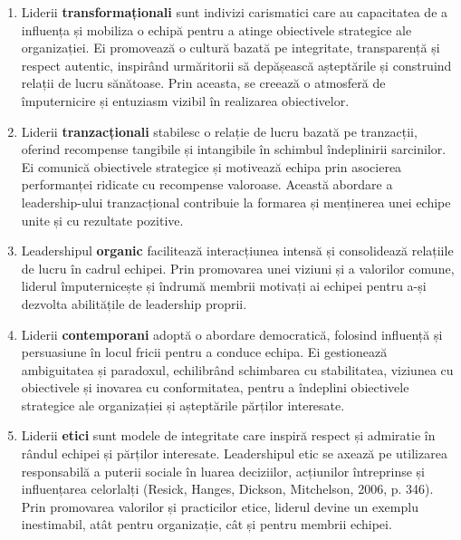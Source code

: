 \documentclass[a4paper, 12pt]{article}
\begin{document}
	\begin{enumerate}[(1)]

		\item Liderii \textbf {transformaționali}  sunt indivizi carismatici care au capacitatea de a influența și mobiliza o echipă pentru a atinge obiectivele strategice ale organizației. Ei promovează o cultură bazată pe integritate, transparență și respect autentic, inspirând urmăritorii să depășească așteptările și construind relații de lucru sănătoase. Prin aceasta, se creează o atmosferă de împuternicire și entuziasm vizibil în realizarea obiectivelor.

		\item Liderii \textbf {tranzacționali} stabilesc o relație de lucru bazată pe tranzacții, oferind recompense tangibile și intangibile în schimbul îndeplinirii sarcinilor. Ei comunică obiectivele strategice și motivează echipa prin asocierea performanței ridicate cu recompense valoroase. Această abordare a leadership-ului tranzacțional contribuie la formarea și menținerea unei echipe unite și cu rezultate pozitive.

		\item Leadershipul \textbf {organic} facilitează interacțiunea intensă și consolidează relațiile de lucru în cadrul echipei. Prin promovarea unei viziuni și a valorilor comune, liderul împuternicește și îndrumă membrii motivați ai echipei pentru a-și dezvolta abilitățile de leadership proprii.
		
		\item Liderii \textbf{contemporani}  adoptă o abordare democratică, folosind influență și persuasiune în locul fricii pentru a conduce echipa. Ei gestionează ambiguitatea și paradoxul, echilibrând schimbarea cu stabilitatea, viziunea cu obiectivele și inovarea cu conformitatea, pentru a îndeplini obiectivele strategice ale organizației și așteptările părților interesate.

		\item Liderii \textbf{etici} sunt modele de integritate care inspiră respect și admiratie în rândul echipei și părților interesate. Leadershipul etic se axează pe utilizarea responsabilă a puterii sociale în luarea deciziilor, acțiunilor întreprinse și influențarea celorlalți (Resick, Hanges, Dickson, Mitchelson, 2006, p. 346). Prin promovarea valorilor și practicilor etice, liderul devine un exemplu inestimabil, atât pentru organizație, cât și pentru membrii echipei.

	\end{enumerate}
\end{document}
